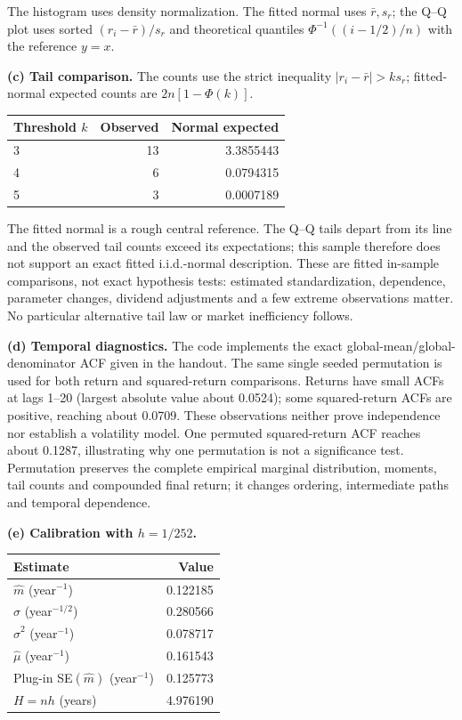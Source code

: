 The histogram uses density normalization. The fitted normal uses $\bar r,s_r$; the Q--Q plot uses sorted $(r_i-\bar r)/s_r$ and theoretical quantiles $\Phi^{-1}((i-1/2)/n)$ with the reference $y=x$.

\textbf{(c) Tail comparison.} The counts use the strict inequality $|r_i-\bar r|>ks_r$; fitted-normal expected counts are $2n[1-\Phi(k)]$.
\begin{center}
\begin{tabular}{lrr}
\toprule
Threshold $k$ & Observed & Normal expected\\\midrule
3 & 13 & 3.3855443\\
4 & 6 & 0.0794315\\
5 & 3 & 0.0007189\\
\bottomrule
\end{tabular}
\end{center}

The fitted normal is a rough central reference. The Q--Q tails depart from its line and the observed tail counts exceed its expectations; this sample therefore does not support an exact fitted i.i.d.-normal description. These are fitted in-sample comparisons, not exact hypothesis tests: estimated standardization, dependence, parameter changes, dividend adjustments and a few extreme observations matter. No particular alternative tail law or market inefficiency follows.

\textbf{(d) Temporal diagnostics.} The code implements the exact global-mean/global-denominator ACF given in the handout. The same single seeded permutation is used for both return and squared-return comparisons. Returns have small ACFs at lags 1--20 (largest absolute value about 0.0524); some squared-return ACFs are positive, reaching about 0.0709. These observations neither prove independence nor establish a volatility model. One permuted squared-return ACF reaches about 0.1287, illustrating why one permutation is not a significance test. Permutation preserves the complete empirical marginal distribution, moments, tail counts and compounded final return; it changes ordering, intermediate paths and temporal dependence.

\textbf{(e) Calibration with $h=1/252$.}
\begin{center}
\begin{tabular}{lr}
\toprule
Estimate & Value\\\midrule
$\widehat m$ (year$^{-1}$) & 0.122185\\
$\widehat\sigma$ (year$^{-1/2}$) & 0.280566\\
$\widehat\sigma^2$ (year$^{-1}$) & 0.078717\\
$\widehat\mu$ (year$^{-1}$) & 0.161543\\
Plug-in SE$(\widehat m)$ (year$^{-1}$) & 0.125773\\
$H=nh$ (years) & 4.976190\\
\bottomrule
\end{tabular}
\end{center}

